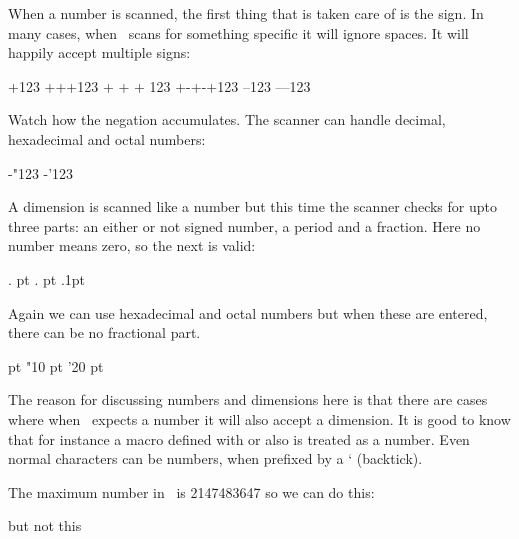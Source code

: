 \startlines \getbuffer \stoplines

When a number is scanned, the first thing that is taken care of is the sign. In many
cases, when \TEX\ scans for something specific it will ignore spaces. It will
happily accept multiple signs:

\startbuffer
\number +123
\number +++123
\number + + + 123
\number +-+-+123
\number --123
\number ---123
\stopbuffer

\typebuffer[option=TEX]

\startlines \getbuffer \stoplines

Watch how the negation accumulates. The scanner can handle decimal, hexadecimal
and octal numbers:

\startbuffer
{}
\number -"123
\number -'123
\stopbuffer

\typebuffer[option=TEX]

\startlines \getbuffer \stoplines

A dimension is scanned like a number but this time the scanner checks for upto
three parts: an either or not signed number, a period and a fraction. Here no
number means zero, so the next is valid:

\startbuffer
\the\dimexpr  . pt \relax
\the{}. pt \relax
\the\dimexpr  .1pt \relax
\the\dimexpr 1.1pt \relax
\stopbuffer

\typebuffer[option=TEX]

\startlines \getbuffer \stoplines

Again we can use hexadecimal and octal numbers but when these are entered, there
can be no fractional part.

\startbuffer
\the{} pt \relax
\the\dimexpr "10 pt \relax
\the\dimexpr '20 pt \relax
\stopbuffer

\typebuffer[option=TEX]

\startlines \getbuffer \stoplines

The reason for discussing numbers and dimensions here is that there are cases where
when \TEX\ expects a number it will also accept a dimension. It is good to know that
for instance a macro defined with \type {\chardef} or \type {\mathchardef} also is
treated as a number. Even normal characters can be numbers, when prefixed by a \type
{`} (backtick).

The maximum number in \TEX\ is 2147483647 so we can do this:

\starttyping[option=TEX]
\stoptyping

but not this

